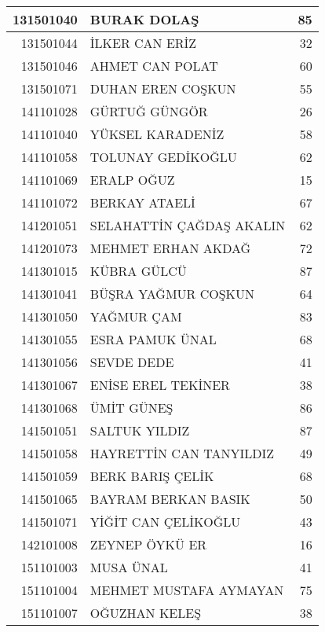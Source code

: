 \documentclass[12pt]{article}
\begin{document}
\begin{longtable}{||r||l||r||}
    \midrule
    131501040 & BURAK DOLAŞ & 85 \\
    \midrule
    131501044 & İLKER CAN ERİZ & 32 \\
    \midrule
    131501046 & AHMET CAN POLAT & 60 \\
    \midrule
    131501071 & DUHAN EREN COŞKUN & 55 \\
    \midrule
    141101028 & GÜRTUĞ GÜNGÖR & 26 \\
    \midrule
    141101040 & YÜKSEL KARADENİZ & \cellcolor[rgb]{ 1,  1,  0} 58 \\
    \midrule
    141101058 & TOLUNAY GEDİKOĞLU & 62 \\
    \midrule
    141101069 & ERALP OĞUZ & 15 \\
    \midrule
    141101072 & BERKAY ATAELİ & 67 \\
    \midrule
    141201051 & SELAHATTİN ÇAĞDAŞ AKALIN & 62 \\
    \midrule
    141201073 & MEHMET ERHAN AKDAĞ & \cellcolor[rgb]{ 1,  1,  0} 72 \\
    \midrule
    141301015 & KÜBRA GÜLCÜ & 87 \\
    \midrule
    141301041 & BÜŞRA YAĞMUR COŞKUN & 64 \\
    \midrule
    141301050 & YAĞMUR ÇAM & 83 \\
    \midrule
    141301055 & ESRA PAMUK ÜNAL & \cellcolor[rgb]{ 1,  1,  0} 68 \\
    \midrule
    141301056 & SEVDE DEDE & 41 \\
    \midrule
    141301067 & ENİSE EREL TEKİNER & 38 \\
    \midrule
    141301068 & ÜMİT GÜNEŞ & 86 \\
    \midrule
    141501051 & SALTUK YILDIZ & 87 \\
    \midrule
    141501058 & HAYRETTİN CAN TANYILDIZ & 49 \\
    \midrule
    141501059 & BERK BARIŞ ÇELİK & 68 \\
    \midrule
    141501065 & BAYRAM BERKAN BASIK & 50 \\
    \midrule
    141501071 & YİĞİT CAN ÇELİKOĞLU & 43 \\
    \midrule
    142101008 & ZEYNEP ÖYKÜ ER & 16 \\
    \midrule
    151101003 & MUSA ÜNAL & \cellcolor[rgb]{ 1,  1,  0} 41 \\
    \midrule
    151101004 & MEHMET MUSTAFA AYMAYAN & \cellcolor[rgb]{ 1,  1,  0} 75 \\
    \midrule
    151101007 & OĞUZHAN KELEŞ & 38 \\

\end{longtable}
\end{document}
